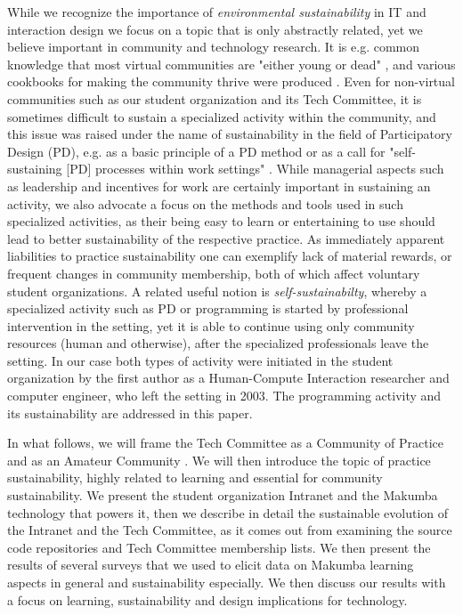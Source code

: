 \documentclass{acm_proc_article-sp}
\begin{document}
While we recognize the importance of {\it environmental sustainability}  in IT and interaction design \cite{blevis07} we focus on a topic that is only abstractly related, yet we believe important in community and technology research. It is e.g. common knowledge that most virtual communities are "either young or dead" \cite{pargman05}, and various cookbooks for making the community thrive were produced \cite{goodwin94}. Even for non-virtual communities such as our student organization and its Tech Committee, it is sometimes difficult to sustain a specialized activity within the community, and this issue was raised under the name of sustainability in the field of Participatory Design (PD), e.g. as a basic principle of a PD method \cite{kensing98} or as a call for "self-sustaining [PD] processes within work settings" \cite{clement93}.  While managerial aspects such as leadership and incentives for work are certainly important in sustaining an activity, we also advocate a focus on the methods and tools used in such specialized activities, as their being easy to learn or entertaining to use should lead to better sustainability of the respective practice. As immediately apparent liabilities to practice sustainability one can exemplify lack of material rewards, or frequent changes in community membership, both of which affect voluntary student organizations. A related useful notion is {\it self-sustainabilty}, whereby a specialized activity such as PD \cite{clement93} or programming is started by professional intervention in the setting, yet it is able to continue using only community resources (human and otherwise), after the specialized professionals leave the setting. In our case both types of activity were initiated in the student organization  by the first author as a Human-Compute Interaction researcher and computer engineer, who left the setting in 2003. The programming activity and its sustainability are addressed in this paper.

In what follows, we will frame the Tech Committee as a Community of Practice \cite{lave_wenger91, wenger98} and as an Amateur Community \cite{bogdan03, bogdan_bowers07}. We will then introduce the topic of practice sustainability, highly related to learning and essential for community sustainability. We present the student organization Intranet and the Makumba technology that powers it, then we describe in detail the sustainable evolution of the Intranet and the Tech Committee, as it comes out from examining the source code repositories and Tech Committee membership lists. We then present the results of several surveys 
that we used to elicit data on Makumba learning aspects in general and sustainability especially. We then discuss our results with a focus on learning, sustainability and design implications for technology.
\end{document}
